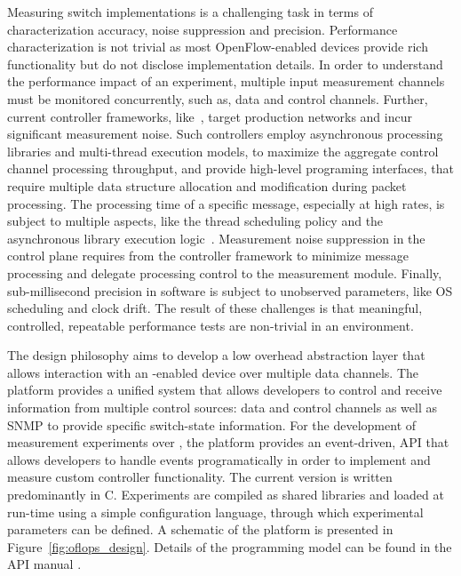 Measuring \of switch implementations is a challenging task in terms of
characterization accuracy, noise suppression and precision.  Performance
characterization is not trivial as most OpenFlow-enabled devices provide rich
functionality but do not disclose implementation details. In order to understand
the performance impact of an experiment, multiple input measurement channels
must be monitored concurrently, such as, data and control channels. Further,
current controller frameworks, like~\cite{Gude08,floodlight}, target production
networks and incur significant measurement noise. Such controllers employ
asynchronous processing libraries and multi-thread execution models, to maximize
the aggregate control channel processing throughput, and provide high-level
programing interfaces, that require multiple data structure allocation and
modification during packet processing.  The processing time of a specific \of
message, especially at high rates, is subject to multiple aspects, like the
thread scheduling policy and the asynchronous library execution
logic~\cite{Jarschel2012}.  Measurement noise suppression in the control plane
requires from the controller framework to minimize message processing and
delegate processing control to the measurement module.  Finally, sub-millisecond
precision in software is subject to unobserved parameters, like OS scheduling
and clock drift. The result of these challenges is that meaningful, controlled,
repeatable performance tests are non-trivial in an \of environment.

The \oflops design philosophy aims to develop a low overhead abstraction layer
that allows interaction with an \of-enabled device over multiple data
channels.  The platform provides a unified system that allows developers to
control and receive information from multiple control sources: data and control
channels as well as SNMP to provide specific switch-state information.
For the development of measurement experiments over \oflops, the platform
provides an event-driven, API that allows developers to handle events
programatically in order to implement and measure custom controller
functionality. The current version is written predominantly in C. Experiments
are compiled as shared libraries and loaded at run-time using a simple
configuration language, through which experimental parameters can be defined.
A schematic of the platform is presented in Figure~\ref{fig:oflops_design}.
Details of the \oflops programming model can be found in the API manual
\cite{oflops-manual}.

